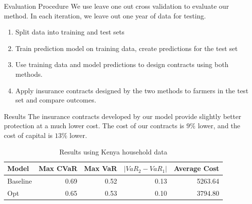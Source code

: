 \documentclass{beamer}
\begin{document}
\begin{frame}{Evaluation Procedure}
We use leave one out cross validation to evaluate our method. In each iteration, we leave out one year of data for testing.
\begin{enumerate}
    \item Split data into training and test sets 
    \item Train prediction model on training data, create predictions for the test set
    \item Use training data and model predictions to design contracts using both methods.
    \item Apply insurance contracts designed by the two methods to farmers in the test set and compare outcomes.
\end{enumerate}
\end{frame}

\begin{frame}{Results}
The insurance contracts developed by our model provide slightly better protection at a much lower cost. The cost of our contracts is $9\%$ lower, and the cost of capital is $13\%$ lower. 
\begin{table}[]
\small
    \centering

\begin{tabular}{lrrrr}
    \toprule
       Model &  Max CVaR &  Max VaR &  $|VaR_2 - VaR_1|$ &  Average Cost \\
    \midrule
    Baseline &      0.69 &     0.52 &               0.13 &       5263.64 \\
         Opt &      0.65 &     0.53 &               0.10 &       3794.80 \\
    \bottomrule
    \end{tabular}
    \caption{Results using Kenya household data}
    
\end{table}
\end{frame}
\end{document}
